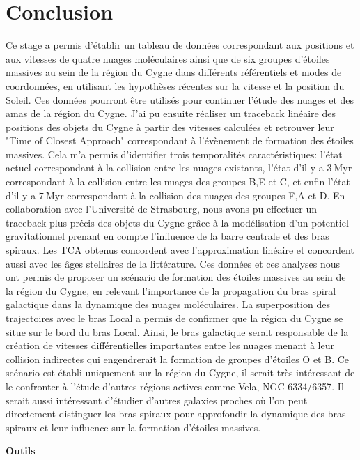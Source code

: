 \documentclass[a4paper, 11pt]{article}
\begin{document}
	\section{Conclusion}
	Ce stage a permis d'établir un tableau de données correspondant aux positions et aux vitesses de quatre nuages moléculaires ainsi que de six groupes d'étoiles massives au sein de la région du Cygne dans différents référentiels et modes de coordonnées, en utilisant les hypothèses récentes sur la vitesse et la position du Soleil. Ces données pourront être utilisés pour continuer l'étude des nuages et des amas de la région du Cygne. J'ai pu ensuite réaliser un traceback linéaire des positions des objets du Cygne à partir des vitesses calculées et retrouver leur "Time of Closest Approach" correspondant à l'évènement de formation des étoiles massives. Cela m'a permis d'identifier trois temporalités caractéristiques: l'état actuel correspondant à la collision entre les nuages existants, l'état d'il y a $3 \ \mathrm{Myr}$ correspondant à la collision entre les nuages des groupes B,E et C, et enfin l'état d'il y a $7 \ \mathrm{Myr}$ correspondant à la collision des nuages des groupes F,A et D.
	En collaboration avec l'Université de Strasbourg, nous avons pu effectuer un traceback plus précis des objets du Cygne grâce à la modélisation d'un potentiel gravitationnel prenant en compte l'influence de la barre centrale et des bras spiraux. Les TCA obtenus concordent avec l'approximation linéaire et concordent aussi avec les âges stellaires de la littérature.
	Ces données et ces analyses nous ont permis de proposer un scénario de formation des étoiles massives au sein de la région du Cygne, en relevant l'importance de la propagation du bras spiral galactique dans la dynamique des nuages moléculaires. La superposition des trajectoires avec le bras Local a permis de confirmer que la région du Cygne se situe sur le bord du bras Local. Ainsi, le bras galactique serait responsable de la création de vitesses différentielles importantes entre les nuages menant à leur collision indirectes qui engendrerait la formation de groupes d'étoiles O et B.
	Ce scénario est établi uniquement sur la région du Cygne, il serait très intéressant de le confronter à l'étude d'autres régions actives comme Vela, NGC 6334/6357. Il serait aussi intéressant d'étudier d'autres galaxies proches où l'on peut directement distinguer les bras spiraux pour approfondir la dynamique des bras spiraux et leur influence sur la formation d'étoiles massives.
	

	
	\nocite{*}
	
	\textbf{Outils}
	
\end{document}
